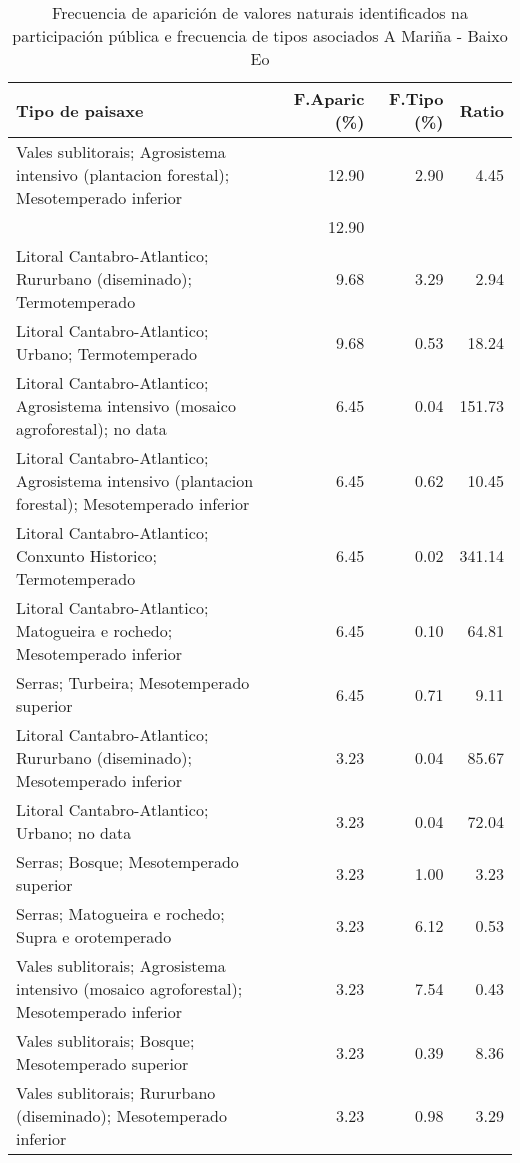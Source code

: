 \begin{table}[p]
\centering
\caption{Frecuencia de aparición de valores naturais identificados na participación pública e frecuencia de tipos asociados A Mariña - Baixo Eo} 
\label{vsixotnat2}
\begin{tabular}{lrrr}
  \hline
Tipo de paisaxe & F.Aparic (\%) & F.Tipo (\%) & Ratio \\ 
  \hline
Vales sublitorais; Agrosistema intensivo (plantacion forestal); Mesotemperado inferior & 12.90 & 2.90 & 4.45 \\ 
   & 12.90 &  &  \\ 
  Litoral Cantabro-Atlantico; Rururbano (diseminado); Termotemperado & 9.68 & 3.29 & 2.94 \\ 
  Litoral Cantabro-Atlantico; Urbano; Termotemperado & 9.68 & 0.53 & 18.24 \\ 
  Litoral Cantabro-Atlantico; Agrosistema intensivo (mosaico agroforestal); no data & 6.45 & 0.04 & 151.73 \\ 
  Litoral Cantabro-Atlantico; Agrosistema intensivo (plantacion forestal); Mesotemperado inferior & 6.45 & 0.62 & 10.45 \\ 
  Litoral Cantabro-Atlantico; Conxunto Historico; Termotemperado & 6.45 & 0.02 & 341.14 \\ 
  Litoral Cantabro-Atlantico; Matogueira e rochedo; Mesotemperado inferior & 6.45 & 0.10 & 64.81 \\ 
  Serras; Turbeira; Mesotemperado superior & 6.45 & 0.71 & 9.11 \\ 
  Litoral Cantabro-Atlantico; Rururbano (diseminado); Mesotemperado inferior & 3.23 & 0.04 & 85.67 \\ 
  Litoral Cantabro-Atlantico; Urbano; no data & 3.23 & 0.04 & 72.04 \\ 
  Serras; Bosque; Mesotemperado superior & 3.23 & 1.00 & 3.23 \\ 
  Serras; Matogueira e rochedo; Supra e orotemperado & 3.23 & 6.12 & 0.53 \\ 
  Vales sublitorais; Agrosistema intensivo (mosaico agroforestal); Mesotemperado inferior & 3.23 & 7.54 & 0.43 \\ 
  Vales sublitorais; Bosque; Mesotemperado superior & 3.23 & 0.39 & 8.36 \\ 
  Vales sublitorais; Rururbano (diseminado); Mesotemperado inferior & 3.23 & 0.98 & 3.29 \\ 
   \hline
\end{tabular}
\end{table}

